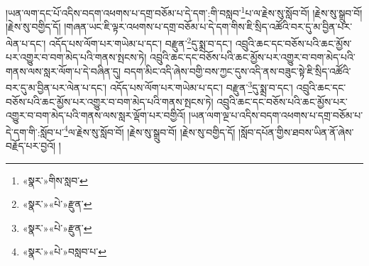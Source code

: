 །ཡན་ལག་དང་པོ་འདིས་བདག་འཕགས་པ་དགྲ་བཅོམ་པ་དེ་དག་:གི་བསླབ་\footnote{«སྣར་»གིས་སླབ་}པ་ལ་རྗེས་སུ་སློབ་བོ། །རྗེས་སུ་སྒྲུབ་བོ། །རྗེས་སུ་བགྱིད་དོ། །གཞན་ཡང་ཇི་ལྟར་འཕགས་པ་དགྲ་བཅོམ་པ་དེ་དག་གིས་ཇི་སྲིད་འཚོའི་བར་དུ་མ་བྱིན་པར་ལེན་པ་དང་། འདོད་པས་ལོག་པར་གཡེམ་པ་དང་། བརྫུན་\footnote{«སྣར་»«པེ་»རྫུན་}དུ་སྨྲ་བ་དང་། འབྲུའི་ཆང་དང་བཅོས་པའི་ཆང་མྱོས་པར་འགྱུར་བ་བག་མེད་པའི་གནས་སྤངས་ཏེ། འབྲུའི་ཆང་དང་བཅོས་པའི་ཆང་མྱོས་པར་འགྱུར་བ་བག་མེད་པའི་གནས་ལས་སླར་ལོག་པ་དེ་བཞིན་དུ། བདག་མིང་འདི་ཞེས་བགྱི་བས་ཀྱང་དུས་འདི་ནས་བཟུང་སྟེ་ཇི་སྲིད་འཚོའི་བར་དུ་མ་བྱིན་པར་ལེན་པ་དང་། འདོད་པས་ལོག་པར་གཡེམ་པ་དང་། བརྫུན་\footnote{«སྣར་»«པེ་»རྫུན་}དུ་སྨྲ་བ་དང་། འབྲུའི་ཆང་དང་བཅོས་པའི་ཆང་མྱོས་པར་འགྱུར་བ་བག་མེད་པའི་གནས་སྤངས་ཏེ། འབྲུའི་ཆང་དང་བཅོས་པའི་ཆང་མྱོས་པར་འགྱུར་བ་བག་མེད་པའི་གནས་ལས་སླར་ལྡོག་པར་བགྱིའོ། །ཡན་ལག་ལྔ་པ་འདིས་བདག་འཕགས་པ་དགྲ་བཅོམ་པ་དེ་དག་གི་:སློབ་པ་\footnote{«སྣར་»«པེ་»བསླབ་པ་}ལ་རྗེས་སུ་སློབ་བོ། །རྗེས་སུ་སྒྲུབ་བོ། །རྗེས་སུ་བགྱིད་དོ། །སློབ་དཔོན་གྱིས་ཐབས་ཡིན་ནོ་ཞེས་བརྗོད་པར་བྱའོ། །

